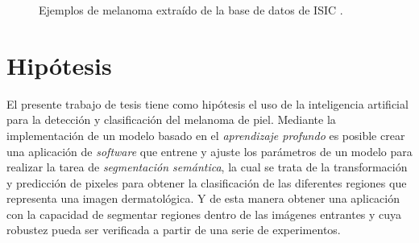 \begin{figure}[b]
    \centering
    \hspace{-0.4cm}
    \caption{Ejemplos de melanoma extraído de la base de datos de ISIC \citep{isic_skin}.}
    
  \end{figure}


\section{Hipótesis}
El presente trabajo de tesis tiene como hipótesis el uso de la inteligencia artificial para la detección y clasificación del melanoma de piel. Mediante la implementación de un modelo basado en el \emph{aprendizaje profundo} es posible crear una aplicación de \emph{software} que entrene y ajuste los parámetros de un modelo para realizar la tarea de \emph{segmentación semántica}, la cual se trata de la transformación y predicción de pixeles para obtener la clasificación de las diferentes regiones que representa una imagen dermatológica. Y de esta manera obtener una aplicación con la capacidad de segmentar regiones dentro de las imágenes entrantes y cuya robustez pueda ser verificada a partir de una serie de experimentos.



